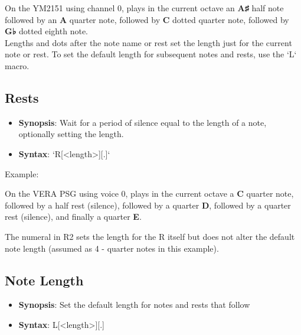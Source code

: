 
On the YM2151 using channel 0, plays in the current octave an
{\ttfamily\bfseries A♯} half note followed by an {\ttfamily\bfseries A} quarter
note, followed by {\ttfamily\bfseries C} dotted quarter note, followed by
{\ttfamily\bfseries G♭} dotted eighth note.\\

Lengths and dots after the note name or rest set the length just for the
current note or rest.  To set the default length for subsequent notes and
rests, use the `L` macro.\\

\subsection{Rests}

\begin{itemize}

	\item {\bfseries Synopsis}: Wait for a period of silence equal to the
		length of a note, optionally setting the length.

	\item {\bfseries Syntax}: `R[<length>][.]`

\end{itemize}

\vspace{16pt}

Example:\\


On the VERA PSG using voice 0, plays in the current octave a
{\ttfamily\bfseries C} quarter note, followed by a half rest (silence),
followed by a quarter {\ttfamily\bfseries D}, followed by a quarter rest
(silence), and finally a quarter {\ttfamily\bfseries E}.

The numeral {} in {\ttfamily R2} sets the length for the {\ttfamily
R} itself but does not alter the default note length (assumed as 4 - quarter
notes in this example).

\subsection{Note Length}

\begin{itemize}

	\item {\bfseries Synopsis}: Set the default length for notes and rests that
		follow

	\item {\bfseries Syntax}: {\ttfamily L[<length>][.]}

\end{itemize}

